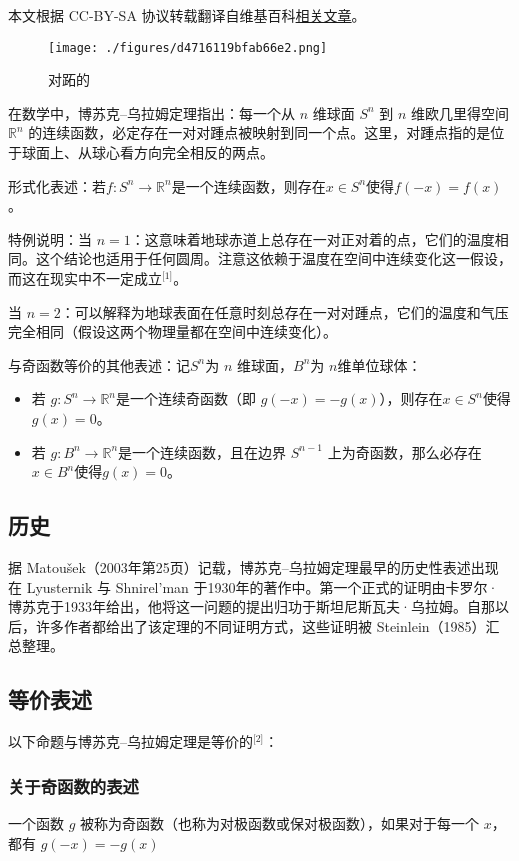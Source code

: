
本文根据 CC-BY-SA 协议转载翻译自维基百科\href{https://en.wikipedia.org/wiki/Borsuk\%E2\%80\%93Ulam_theorem}{相关文章}。

\begin{figure}[ht]
\centering
\texttt{[image: ./figures/d4716119bfab66e2.png]}
\caption{对跖的} \label{fig_BSKwlm_2}
\end{figure}
在数学中，博苏克–乌拉姆定理指出：每一个从 $n$ 维球面 $S^n$ 到 $n$ 维欧几里得空间 $\mathbb{R}^n$ 的连续函数，必定存在一对对踵点被映射到同一个点。这里，对踵点指的是位于球面上、从球心看方向完全相反的两点。

形式化表述：若$f: S^n \to \mathbb{R}^n$是一个连续函数，则存在$x \in S^n$使得$f(-x) = f(x)$。

特例说明：当 $ n = 1$：这意味着地球赤道上总存在一对正对着的点，它们的温度相同。这个结论也适用于任何圆周。注意这依赖于温度在空间中连续变化这一假设，而这在现实中不一定成立\(^\text{[1]}\)。

当 $ n = 2 $：可以解释为地球表面在任意时刻总存在一对对踵点，它们的温度和气压完全相同（假设这两个物理量都在空间中连续变化）。

与奇函数等价的其他表述：记$ S^n $为 $n$ 维球面，$ B^n $为 $n$维单位球体：
\begin{itemize}
\item 若  $g: S^n \to \mathbb{R}^n$是一个连续奇函数（即 $g(-x) = -g(x)$），则存在$x \in S^n$使得$g(x) = 0$。
\item 若 $g: B^n \to \mathbb{R}^n$是一个连续函数，且在边界 $S^{n-1}$ 上为奇函数，那么必存在$x \in B^n$使得$g(x) = 0$。
\end{itemize}
\subsection{历史}
据 Matoušek（2003年第25页）记载，博苏克–乌拉姆定理最早的历史性表述出现在 Lyusternik 与 Shnirel'man 于1930年的著作中。第一个正式的证明由卡罗尔·博苏克于1933年给出，他将这一问题的提出归功于斯坦尼斯瓦夫·乌拉姆。自那以后，许多作者都给出了该定理的不同证明方式，这些证明被 Steinlein（1985）汇总整理。
\subsection{等价表述}
以下命题与博苏克–乌拉姆定理是等价的\(^\text{[2]}\)：
\subsubsection{关于奇函数的表述}
一个函数 $g$ 被称为奇函数（也称为对极函数或保对极函数），如果对于每一个 $x$，都有
$g(-x) = -g(x)$

